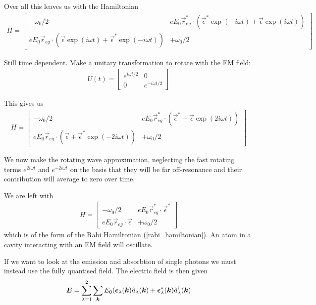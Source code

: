Over all this leaves us with the Hamiltonian
\begin{align}
  H =
  \begin{bmatrix}
    -\omega_0/2 & eE_0\vec{r}_{eg}^*\cdot(\vec{\epsilon}^*\exp(-i\omega t) + \vec{\epsilon}\exp(i\omega t)) \\
    eE_0\vec{r}_{eg}\cdot(\vec{\epsilon}\exp(i\omega t) + \vec{\epsilon}^*\exp(-i\omega t)) & +\omega_0/2
  \end{bmatrix}
\end{align}

Still time dependent. Make a unitary transformation to rotate with the EM field:
\begin{align}
  U(t) =
  \begin{bmatrix}
    e^{i\omega t/2} & 0 \\
    0 & e^{-i\omega t/2}
  \end{bmatrix}
\end{align}

This gives us
\begin{align}
  H =
  \begin{bmatrix}
    -\omega_0/2 & eE_0\vec{r}_{eg}^*\cdot(\vec{\epsilon}^* + \vec{\epsilon}\exp(2i\omega t)) \\
    eE_0\vec{r}_{eg}\cdot(\vec{\epsilon} + \vec{\epsilon}^*\exp(-2i\omega t)) & +\omega_0/2
  \end{bmatrix}
\end{align}

We now make the rotating wave approximation, neglecting the fast rotating terms $e^{2i\omega t}$ and $e^{-2i\omega t}$ on the basis that they will be far off-resonance and their contribution will average to zero over time. 

We are left with
\begin{align}
  H =
  \begin{bmatrix}
    -\omega_0/2 & eE_0\vec{r}_{eg}^*\cdot\vec{\epsilon}^* \\
    eE_0\vec{r}_{eg}\cdot\vec{\epsilon} & +\omega_0/2
  \end{bmatrix}
\end{align}
which is of the form of the Rabi Hamiltonian (\ref{rabi_hamiltonian}). An atom in a cavity interacting with an EM field will oscillate.

If we want to look at the emission and absorbtion of single photons we must instead use the fully quantised field. The electric field is then given 
\begin{align}
  {\boldsymbol{E}} = \sum_{\lambda = 1}^2 \sum_{{\boldsymbol{k}}} E_0 ({\boldsymbol{\epsilon}}_\lambda({\boldsymbol{k}})\hat{a}_\lambda({\boldsymbol{k}})+ {\boldsymbol{\epsilon}}^*_\lambda({\boldsymbol{k}})\hat{a}^\dagger_\lambda({\boldsymbol{k}})
\end{align}



